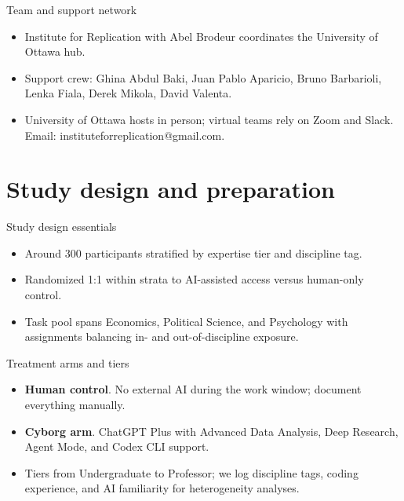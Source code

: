 \documentclass[aspectratio=169,professionalfonts]{beamer}
\begin{document}
\begin{frame}{Team and support network}
  \begin{itemize}
    \item Institute for Replication with Abel Brodeur coordinates the University of Ottawa hub.
    \item Support crew: Ghina Abdul Baki, Juan Pablo Aparicio, Bruno Barbarioli, Lenka Fiala, Derek Mikola, David Valenta.
    \item University of Ottawa hosts in person; virtual teams rely on Zoom and Slack. Email: instituteforreplication@gmail.com.
  \end{itemize}
\end{frame}

\section{Study design and preparation}

\begin{frame}{Study design essentials}
  \begin{itemize}
    \item Around 300 participants stratified by expertise tier and discipline tag.
    \item Randomized 1:1 within strata to AI-assisted access versus human-only control.
    \item Task pool spans Economics, Political Science, and Psychology with assignments balancing in- and out-of-discipline exposure.
  \end{itemize}
\end{frame}

\begin{frame}{Treatment arms and tiers}
  \begin{itemize}
    \item \textbf{Human control}. No external AI during the work window; document everything manually.
    \item \textbf{Cyborg arm}. ChatGPT Plus with Advanced Data Analysis, Deep Research, Agent Mode, and Codex CLI support.
    \item Tiers from Undergraduate to Professor; we log discipline tags, coding experience, and AI familiarity for heterogeneity analyses.
  \end{itemize}
\end{frame}
\end{document}
